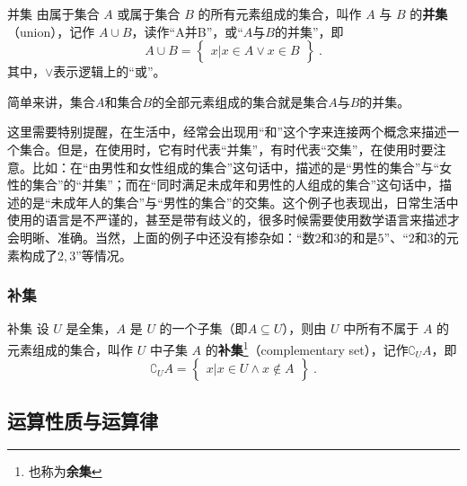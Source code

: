 \begin{definition}{并集}
由属于集合 $A$ 或属于集合 $B$ 的所有元素组成的集合，叫作 $A$ 与 $B$ 的\textbf{并集}（union），记作 $A\cup B$，读作“A并B”，或“$A$与$B$的并集”，即
\begin{equation}
A\cup B = \begin{Bmatrix}x|x\in A \lor x\in B\end{Bmatrix}~.
\end{equation}
其中，$\lor$表示逻辑上的“或”。
\end{definition}

简单来讲，集合$A$和集合$B$的全部元素组成的集合就是集合$A$与$B$的并集。

这里需要特别提醒，在生活中，经常会出现用“和”这个字来连接两个概念来描述一个集合。但是，在使用时，它有时代表“并集”，有时代表“交集”，在使用时要注意。比如：在“由男性和女性组成的集合”这句话中，描述的是“男性的集合”与“女性的集合”的“并集”；而在“同时满足未成年和男性的人组成的集合”这句话中，描述的是“未成年人的集合”与“男性的集合”的交集。这个例子也表现出，日常生活中使用的语言是不严谨的，甚至是带有歧义的，很多时候需要使用数学语言来描述才会明晰、准确。当然，上面的例子中还没有掺杂如：“数$2$和$3$的和是$5$”、“${2}$和${3}$的元素构成了${2,3}$”等情况。

\subsubsection{补集}
\begin{definition}{补集}
设 $U$ 是全集，$A$ 是 $U$ 的一个子集（即$A\subseteq U$），则由 $U$ 中所有不属于 $A$ 的元素组成的集合，叫作 $U$ 中子集 $A$ 的\textbf{补集}\footnote{也称为\textbf{余集}}（complementary set），记作$\complement_UA$，即
\begin{equation}
\complement_UA = \begin{Bmatrix}x|x\in U \wedge x\notin A\end{Bmatrix}~.
\end{equation}
\end{definition}


\subsection{运算性质与运算律}


